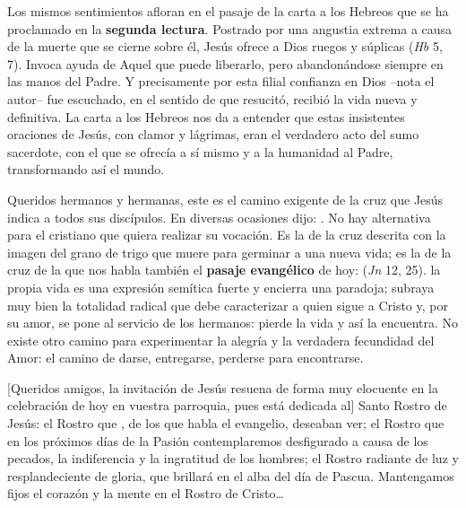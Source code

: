 \begin{body}
Los mismos sentimientos afloran en el pasaje de la carta a los Hebreos que se ha proclamado en la \textbf{segunda lectura}. Postrado por una angustia extrema a causa de la muerte que se cierne sobre él, Jesús ofrece a Dios ruegos y súplicas  (\textit{Hb} 5, 7). Invoca ayuda de Aquel que puede liberarlo, pero abandonándose siempre en las manos del Padre. Y precisamente por esta filial confianza en Dios –nota el autor– fue escuchado, en el sentido de que resucitó, recibió la vida nueva y definitiva. La carta a los Hebreos nos da a entender que estas insistentes oraciones de Jesús, con clamor y lágrimas, eran el verdadero acto del sumo sacerdote, con el que se ofrecía a sí mismo y a la humanidad al Padre, transformando así el mundo.

Queridos hermanos y hermanas, este es el camino exigente de la cruz que Jesús indica a todos sus discípulos. En diversas ocasiones dijo: . No hay alternativa para el cristiano que quiera realizar su vocación. Es la  de la cruz descrita con la imagen del grano de trigo que muere para germinar a una nueva vida; es la  de la cruz de la que nos habla también el \textbf{pasaje evangélico} de hoy:  (\textit{Jn} 12, 25).  la propia vida es una expresión semítica fuerte y encierra una paradoja; subraya muy bien la totalidad radical que debe caracterizar a quien sigue a Cristo y, por su amor, se pone al servicio de los hermanos: pierde la vida y así la encuentra. No existe otro camino para experimentar la alegría y la verdadera fecundidad del Amor: el camino de darse, entregarse, perderse para encontrarse.

[Queridos amigos, la invitación de Jesús resuena de forma muy elocuente en la celebración de hoy en vuestra parroquia, pues está dedicada al] Santo Rostro de Jesús: el Rostro que , de los que habla el evangelio, deseaban ver; el Rostro que en los próximos días de la Pasión contemplaremos desfigurado a causa de los pecados, la indiferencia y la ingratitud de los hombres; el Rostro radiante de luz y resplandeciente de gloria, que brillará en el alba del día de Pascua. Mantengamos fijos el corazón y la mente en el Rostro de Cristo\ldots


\end{body}
